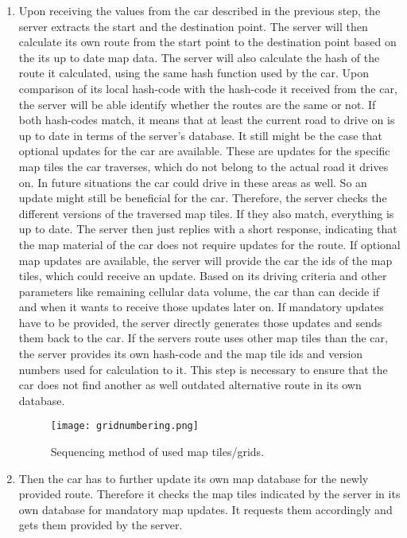 \begin{enumerate}
\item Upon receiving the values from the car described in the previous step, the server extracts the start and the destination point. The server will then calculate its own route from the start point to the destination point based on the its up to date map data. The server will also calculate the hash of the route it calculated, using the same hash function used by the car. Upon comparison of its local hash-code with the hash-code it received from the car, the server will be able identify whether the routes are the same or not. If both hash-codes match, it means that at least the current road to drive on is up to date in terms of the server's database. It still might be the case that optional updates for the car are available. These are updates for the specific map tiles the car traverses, which do not belong to the actual road it drives on. In future situations the car could drive in these areas as well. So an update might still be beneficial for the car. Therefore, the server checks the different versions of the traversed map tiles. If they also match, everything is up to date. The server then just replies with a short response, indicating that the map material of the car does not require updates for the route. If optional map updates are available, the server will provide the car the ids of the map tiles, which could receive an update. Based on its driving criteria and other parameters like remaining cellular data volume, the car than can decide if and when it wants to receive those updates later on. If mandatory updates have to be provided, the server directly generates those updates and sends them back to the car. If the servers route uses other map tiles than the car, the server provides its own hash-code and the map tile ids and version numbers used for calculation to it. This step is necessary to ensure that the car does not find another as well outdated alternative route in its own database. 


\begin{figure}
\centering
\texttt{[image: gridnumbering.png]}
\label{fg:numberingtiles}
\caption{Sequencing method of used map tiles/grids.}
\end{figure}




\item Then the car has to further update its own map database for the newly provided route. Therefore it checks the map tiles indicated by the server in its own database for mandatory map updates. It requests them accordingly and gets them provided by the server.


\end{enumerate}
